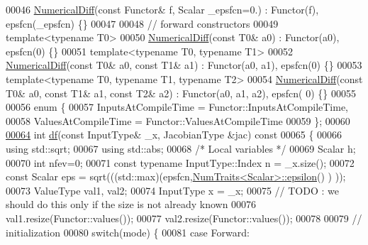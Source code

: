 \begin{DoxyCode}
00046     \hyperlink{class_eigen_1_1_numerical_diff}{NumericalDiff}(\textcolor{keyword}{const} Functor& f, Scalar \_epsfcn=0.) : Functor(f), epsfcn(\_epsfcn) \{\}
00047 
00048     \textcolor{comment}{// forward constructors}
00049     \textcolor{keyword}{template}<\textcolor{keyword}{typename} T0>
00050         \hyperlink{class_eigen_1_1_numerical_diff}{NumericalDiff}(\textcolor{keyword}{const} T0& a0) : Functor(a0), epsfcn(0) \{\}
00051     \textcolor{keyword}{template}<\textcolor{keyword}{typename} T0, \textcolor{keyword}{typename} T1>
00052         \hyperlink{class_eigen_1_1_numerical_diff}{NumericalDiff}(\textcolor{keyword}{const} T0& a0, \textcolor{keyword}{const} T1& a1) : Functor(a0, a1), epsfcn(0) \{\}
00053     \textcolor{keyword}{template}<\textcolor{keyword}{typename} T0, \textcolor{keyword}{typename} T1, \textcolor{keyword}{typename} T2>
00054         \hyperlink{class_eigen_1_1_numerical_diff}{NumericalDiff}(\textcolor{keyword}{const} T0& a0, \textcolor{keyword}{const} T1& a1, \textcolor{keyword}{const} T2& a2) : Functor(a0, a1, a2), epsfcn(
      0) \{\}
00055 
00056     \textcolor{keyword}{enum} \{
00057         InputsAtCompileTime = Functor::InputsAtCompileTime,
00058         ValuesAtCompileTime = Functor::ValuesAtCompileTime
00059     \};
00060 
\hyperlink{class_eigen_1_1_numerical_diff_a8fc63f1c3307cc6e61dc4d70c57b5037}{00064}     \textcolor{keywordtype}{int} \hyperlink{class_eigen_1_1_numerical_diff_a8fc63f1c3307cc6e61dc4d70c57b5037}{df}(\textcolor{keyword}{const} InputType& \_x, JacobianType &jac)\textcolor{keyword}{ const}
00065 \textcolor{keyword}{    }\{
00066         \textcolor{keyword}{using} std::sqrt;
00067         \textcolor{keyword}{using} std::abs;
00068         \textcolor{comment}{/* Local variables */}
00069         Scalar h;
00070         \textcolor{keywordtype}{int} nfev=0;
00071         \textcolor{keyword}{const} \textcolor{keyword}{typename} InputType::Index n = \_x.size();
00072         \textcolor{keyword}{const} Scalar eps = sqrt(((std::max)(epsfcn,\hyperlink{group___core___module_struct_eigen_1_1_num_traits}{NumTraits<Scalar>::epsilon}() )
      ));
00073         ValueType val1, val2;
00074         InputType x = \_x;
00075         \textcolor{comment}{// TODO : we should do this only if the size is not already known}
00076         val1.resize(Functor::values());
00077         val2.resize(Functor::values());
00078 
00079         \textcolor{comment}{// initialization}
00080         \textcolor{keywordflow}{switch}(mode) \{
00081             \textcolor{keywordflow}{case} Forward:

\end{DoxyCode}
